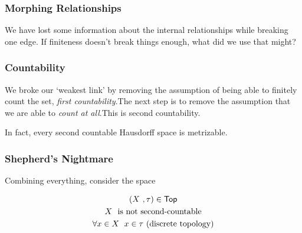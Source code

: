 \begin{frame}
    \frametitle{Morphing Relationships}
    \centering

    \pause

    \begin{center}
        We have lost some information about the internal relationships while
        breaking one edge. \pause If finiteness doesn't break things enough,
        what did we use that might?
    \end{center}

\end{frame}

\begin{frame}
    \frametitle{Countability}

    We broke our `weakest link' by removing the assumption of being able to
    finitely count the set, \emph{first countability}.\pause The next step is to
    remove the assumption that we are able to \emph{count at all}.\pause This is
    second countability.

    \pause

    In fact, every second countable Hausdorff space is metrizable.

\end{frame}

\begin{frame}
    \frametitle{Shepherd's Nightmare}

    Combining everything, consider the space

    \begin{gather*}
        (X~, \tau) \in \textsf{Top}\\
        X~ \textnormal{ is not second-countable}\\
        \forall x \in X~ \; x \in \tau \textnormal{ (discrete topology)}
    \end{gather*}

\end{frame}